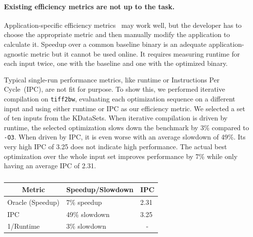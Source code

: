     \paragraph{Existing efficiency metrics are not up to the task.} Application-specific efficiency metrics~\cite{alameldeen06,coppa14} may
    work well, but the developer has to choose the appropriate metric and then manually modify the application to calculate it. Speedup
    over a common baseline binary is an adequate application-agnostic metric but it cannot be used online. It requires measuring runtime
    for each input twice, one with the baseline and one with the optimized binary.

    Typical single-run performance metrics, like runtime or Instructions Per Cycle~(IPC), are not fit for purpose. To show this, we
    performed iterative compilation on \texttt{tiff2bw}, evaluating each optimization sequence on a different input and using either
    runtime or IPC as our efficiency metric. We selected a set of ten inputs from the KDataSets. When
    iterative compilation is driven by runtime, the selected optimization slows down the benchmark by 3\% compared to \texttt{-O3}. When
    driven by IPC, it is even worse with an average slowdown of 49\%. Its very high IPC of 3.25 does not indicate high performance. The
    actual best optimization over the whole input set improves performance by 7\% while only having an average IPC of 2.31.

\begin{table}[h]
\centering
\label{tab:motivation_metrics}
\begin{tabular}{|l|l|l|}
\hline
\multicolumn{1}{|c|}{Metric} & \multicolumn{1}{c|}{Speedup/Slowdown} & \multicolumn{1}{c|}{IPC} \\ \hline
Oracle (Speedup)             & 7\% speedup                                 & 2.31                      \\ \hline
IPC                          & 49\% slowdown                                & 3.25                      \\ \hline
1/Runtime                    & 3\% slowdown                                  & \multicolumn{1}{c|}{-}   \\ \hline
\end{tabular}
\caption{}
\end{table}






